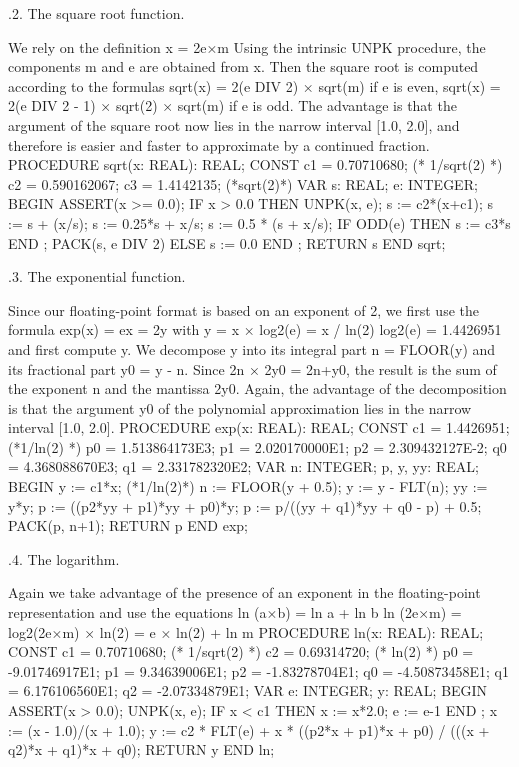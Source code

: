 .2. The square root function.

We rely on the definition x = 2e×m Using the intrinsic UNPK procedure, the components m and e are obtained from x. Then the square root is computed according to the formulas
sqrt(x) = 2(e DIV 2) × sqrt(m) if e is even, sqrt(x) = 2(e DIV 2 - 1) × sqrt(2) × sqrt(m) if e is odd.
The advantage is that the argument of the square root now lies in the narrow interval [1.0, 2.0], and therefore is easier and faster to approximate by a continued fraction.
PROCEDURE sqrt(x: REAL): REAL; CONST c1 = 0.70710680; (* 1/sqrt(2) *)
c2 = 0.590162067;
c3 = 1.4142135; (*sqrt(2)*) VAR s: REAL; e: INTEGER;
BEGIN ASSERT(x >= 0.0); IF x > 0.0 THEN
UNPK(x, e);
s := c2*(x+c1);
s := s + (x/s);
s := 0.25*s + x/s;
s := 0.5 * (s + x/s);
IF ODD(e) THEN s := c3*s END ; PACK(s, e DIV 2)
ELSE s := 0.0 END ; RETURN s
END sqrt;

.3. The exponential function.

Since our floating-point format is based on an exponent of 2, we first use the formula exp(x) = ex = 2y with y = x × log2(e) = x / ln(2) log2(e) = 1.4426951
and first compute y. We decompose y into its integral part n = FLOOR(y) and its fractional part y0 = y - n. Since 2n × 2y0 = 2n+y0, the result is the sum of the exponent n and the mantissa 2y0. Again, the advantage of the decomposition is that the argument y0 of the polynomial approximation lies in the narrow interval [1.0, 2.0].
PROCEDURE exp(x: REAL): REAL; CONST c1 = 1.4426951; (*1/ln(2) *)
p0 = 1.513864173E3; p1 = 2.020170000E1; p2 = 2.309432127E-2; q0 = 4.368088670E3; q1 = 2.331782320E2;
VAR n: INTEGER; p, y, yy: REAL; BEGIN y := c1*x; (*1/ln(2)*)
n := FLOOR(y + 0.5); y := y - FLT(n); yy := y*y;
p := ((p2*yy + p1)*yy + p0)*y;
p := p/((yy + q1)*yy + q0 - p) + 0.5; PACK(p, n+1); RETURN p
END exp;

.4. The logarithm.

Again we take advantage of the presence of an exponent in the floating-point representation and use the equations
ln (a×b) = ln a + ln b
ln (2e×m) = log2(2e×m) × ln(2) = e × ln(2) + ln m
PROCEDURE ln(x: REAL): REAL;
CONST c1 = 0.70710680; (* 1/sqrt(2) *)
c2 = 0.69314720; (* ln(2) *) p0 = -9.01746917E1;
p1 = 9.34639006E1;
p2 = -1.83278704E1;
q0 = -4.50873458E1; q1 = 6.176106560E1; q2 = -2.07334879E1;
VAR e: INTEGER; y: REAL;
BEGIN ASSERT(x > 0.0); UNPK(x, e);
IF x < c1 THEN x := x*2.0; e := e-1 END ;
x := (x - 1.0)/(x + 1.0);
y := c2 * FLT(e) + x * ((p2*x + p1)*x + p0) / (((x + q2)*x + q1)*x + q0); RETURN y
END ln;

